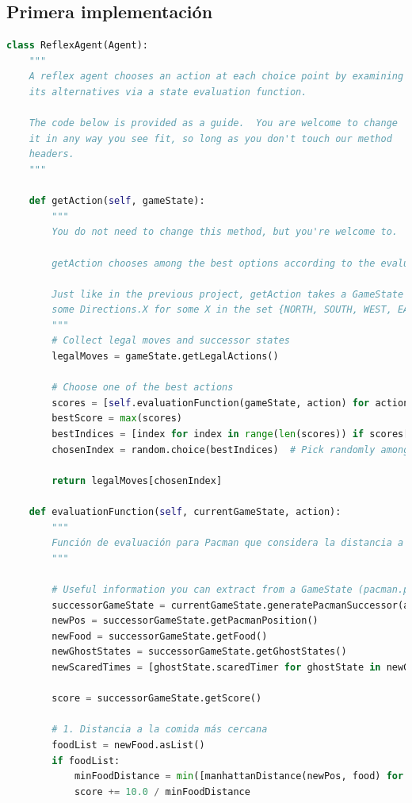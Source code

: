 \documentclass{report}
\begin{document}
        \subsection*{Primera implementación}
          \begin{lstlisting}[language=Python, caption=Implementación inicial del agente reflex]
class ReflexAgent(Agent):
    """
    A reflex agent chooses an action at each choice point by examining
    its alternatives via a state evaluation function.

    The code below is provided as a guide.  You are welcome to change
    it in any way you see fit, so long as you don't touch our method
    headers.
    """

    def getAction(self, gameState):
        """
        You do not need to change this method, but you're welcome to.

        getAction chooses among the best options according to the evaluation function.

        Just like in the previous project, getAction takes a GameState and returns
        some Directions.X for some X in the set {NORTH, SOUTH, WEST, EAST, STOP}
        """
        # Collect legal moves and successor states
        legalMoves = gameState.getLegalActions()

        # Choose one of the best actions
        scores = [self.evaluationFunction(gameState, action) for action in legalMoves]
        bestScore = max(scores)
        bestIndices = [index for index in range(len(scores)) if scores[index] == bestScore]
        chosenIndex = random.choice(bestIndices)  # Pick randomly among the best

        return legalMoves[chosenIndex]

    def evaluationFunction(self, currentGameState, action):
        """
        Función de evaluación para Pacman que considera la distancia a la comida, la proximidad a los fantasmas y la cantidad de comida restante.
        """

        # Useful information you can extract from a GameState (pacman.py)
        successorGameState = currentGameState.generatePacmanSuccessor(action)
        newPos = successorGameState.getPacmanPosition()
        newFood = successorGameState.getFood()
        newGhostStates = successorGameState.getGhostStates()
        newScaredTimes = [ghostState.scaredTimer for ghostState in newGhostStates]

        score = successorGameState.getScore()

        # 1. Distancia a la comida más cercana
        foodList = newFood.asList()
        if foodList:
            minFoodDistance = min([manhattanDistance(newPos, food) for food in foodList])
            score += 10.0 / minFoodDistance


\end{lstlisting}
\end{document}
